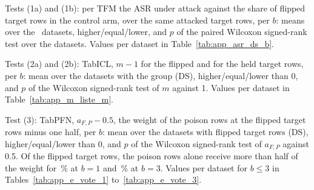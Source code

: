 \begin{table}[H]
\caption{The tests of the study. Each test is run at every number of poison rows $b$ from one to five, over the datasets that have target rows of the given group.}
\label{tab:tests}
\centering\scriptsize
{}
\end{table}

\begin{table}[H]
\caption{Tests (1a) and (1b): per TFM the ASR under attack against the share of flipped target rows in the control arm, over the same attacked target rows, per $b$: means over the \zDS\ datasets, higher/equal/lower, and $p$ of the paired Wilcoxon signed-rank test over the datasets. Values per dataset in Table~\ref{tab:app_asr_ds_b}.}
\label{tab:test_a}

\end{table}

\begin{table}[H]
\caption{Tests (2a) and (2b): TabICL, $m - 1$ for the flipped and for the held target rows, per $b$: mean over the datasets with the group (DS), higher/equal/lower than 0, and $p$ of the Wilcoxon signed-rank test of $m$ against 1. Values per dataset in Table~\ref{tab:app_m_liste_m}.}
\label{tab:test_d}

\end{table}

\begin{table}[H]
\caption{Test (3): TabPFN, $a_{F,P} - 0.5$, the weight of the poison rows at the flipped target rows minus one half, per $b$: mean over the datasets with flipped target rows (DS), higher/equal/lower than 0, and $p$ of the Wilcoxon signed-rank test of $a_{F,P}$ against 0.5. Of the flipped target rows, the poison rows alone receive more than half of the weight for \zPFNaPueberZielEins\,\% at $b = 1$ and \zPFNaPueberZielDrei\,\% at $b = 3$. Values per dataset for $b \leq 3$ in Tables~\ref{tab:app_e_vote_1} to~\ref{tab:app_e_vote_3}.}
\label{tab:test_e}

\end{table}


